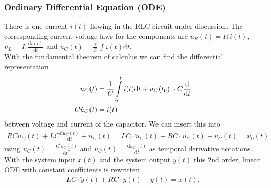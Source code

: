 \documentclass[11pt,a4paper,DIV=12]{scrartcl}
\begin{document}
\subsubsection{Ordinary Differential Equation (ODE)}
There is one current $i(t)$ flowing in the RLC circuit under discussion.
The corresponding current-voltage laws for the components are
$u_R(t) = R\,i(t)$,
$u_L = L\,\frac{\mathrm{d}i(t)}{\mathrm{d} t}$ and
$u_C(t) = \frac{1}{C} \, \int i(t) \mathrm{d}t$.\\
With the fundamental theorem of calculus we can find the differential representation
\begin{align}
\label{eq:u_c}
u_C(t) &= \frac{1}{C}\int\limits_{t_0}^{t} i(t) \mathrm{d} t+u_C(t_0) \bigg | \cdot C\frac{\mathrm{d}}{\mathrm{d} t} \nonumber \\
C\dot u_C(t) &= i(t) \nonumber
\end{align}
between voltage and current of the capacitor.
%
We can insert this into 
%
\begin{align}
RC \dot u_C(t)+LC\frac{\mathrm{d}\dot u_C(t)}{\mathrm{d}t}+u_C(t)=L C \cdot \ddot{u}_C(t) + R C \cdot \dot{u}_C(t) + u_C(t) = u_0(t)
\end{align}
using
$\ddot{u}_C(t) = \frac{\mathrm{d}^2 u_C(t)}{\mathrm{d}t^2}$ and
$\dot{u}_C(t) = \frac{\mathrm{d} u_C(t)}{\mathrm{d}t}$
as temporal derivative notations.
%
With
the system input $x(t)$ and
the system output $y(t)$ this 2nd order, linear ODE with
constant coefficients is rewritten
\begin{align}
\label{eq:ODE_RLC}
L C \cdot \ddot{y}(t) + R C \cdot \dot{y}(t) + y(t) = x(t).
\end{align}



\end{document}
